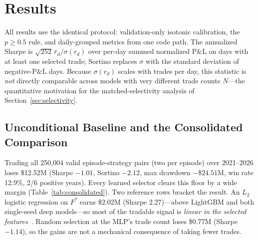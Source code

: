 \documentclass[sigconf,review]{acmart}
\begin{document}
\section{Results}
\label{sec:results}

All results use the identical protocol: validation-only isotonic calibration, the $p\ge0.5$ rule, and daily-grouped metrics from one code path. The annualized Sharpe is $\sqrt{252}\,\bar r_d/\sigma(r_d)$ over per-day summed normalized P\&L on days with at least one selected trade; Sortino replaces $\sigma$ with the standard deviation of negative-P\&L days. Because $\sigma(r_d)$ scales with trades per day, this statistic is \emph{not} directly comparable across models with very different trade counts $N$---the quantitative motivation for the matched-selectivity analysis of Section~\ref{sec:selectivity}.

\subsection{Unconditional Baseline and the Consolidated Comparison}
Trading all 250{,}004 valid episode-strategy pairs (two per episode) over 2021--2026 loses \$12.52M (Sharpe $-1.01$, Sortino $-2.12$, max drawdown $-\$24.51$M, win rate 12.9\%, 2/6 positive years). Every learned selector clears this floor by a wide margin (Table~\ref{tab:consolidated}). Two reference rows bracket the result. An $L_2$ logistic regression on $F^{\ast}$ earns \$2.02M (Sharpe 2.27)---above LightGBM and both single-seed deep models---so most of the tradable signal is \emph{linear in the selected features}~\cite{grinsztajn2022why,shwartzziv2022tabular}. Random selection at the MLP's trade count loses \$0.77M (Sharpe $-1.14$), so the gains are not a mechanical consequence of taking fewer trades.
\end{document}

